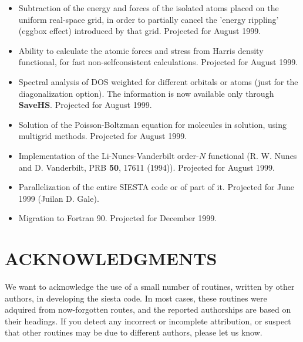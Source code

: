 \begin{itemize}

\item
Subtraction of the energy and forces of the isolated atoms placed
on the uniform real-space grid, in order to partially cancel the
'energy rippling' (eggbox effect) introduced by that grid.
Projected for August 1999.

\item
Ability to calculate the atomic forces and stress from Harris density 
functional, for fast non-selfconsistent calculations.
Projected for August 1999.

\item
Spectral analysis of DOS weighted for different orbitals or atoms
(just for the diagonalization option). The information is now
available only through {\bf SaveHS}. Projected for August 1999.

\item
Solution of the Poisson-Boltzman equation for molecules in solution,
using multigrid methods.
Projected for August 1999.

\item
Implementation of the Li-Nunes-Vanderbilt order-$N$ functional
(R. W. Nunes and D. Vanderbilt, PRB {\bf 50}, 17611 (1994)).
Projected for August 1999.

\item
Parallelization of the entire SIESTA code or of part of it.
Projected for June 1999 (Juilan D. Gale).

\item 
Migration to Fortran 90. Projected for December 1999.

\end{itemize}





\section{ACKNOWLEDGMENTS}

We want to acknowledge the use of a small number of routines,
written by other authors, in developing the siesta code.
In most cases, these routines were adquired from now-forgotten 
routes, and the reported authorships are based on their headings.
If you detect any incorrect or incomplete attribution, or suspect
that other routines may be due to different authors, please
let us know.

